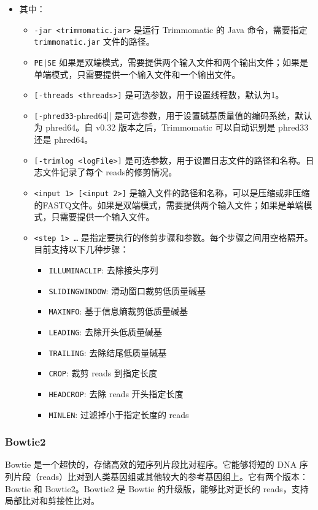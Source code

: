 \documentclass[UTF8]{ctexart}
\begin{document}
\begin{itemize}
	\item 其中：
	\begin{itemize}
		\item \verb|-jar <trimmomatic.jar>| 是运行 Trimmomatic 的 Java 命令，需要指定\\ \verb|trimmomatic.jar| 文件的路径。
		\item \verb!PE|SE! 如果是双端模式，需要提供两个输入文件和两个输出文件；如果是单端模式，只需要提供一个输入文件和一个输出文件。
		\item \verb|[-threads <threads>]| 是可选参数，用于设置线程数，默认为1。
		\item \verb|[-phred33|-phred64]| 是可选参数，用于设置碱基质量值的编码系统，默认为 phred64。自 v0.32 版本之后，Trimmomatic 可以自动识别是 phred33 还是 phred64。
		\item \verb|[-trimlog <logFile>]| 是可选参数，用于设置日志文件的路径和名称。日志文件记录了每个 reads的修剪情况。 
		\item \verb|<input 1> [<input 2>]| 是输入文件的路径和名称，可以是压缩或非压缩的FASTQ文件。如果是双端模式，需要提供两个输入文件；如果是单端模式，只需要提供一个输入文件。
		\item \verb|<step 1> …| 是指定要执行的修剪步骤和参数。每个步骤之间用空格隔开。目前支持以下几种步骤：
		\begin{itemize}
			\item \verb|ILLUMINACLIP|: 去除接头序列
			\item \verb|SLIDINGWINDOW|: 滑动窗口裁剪低质量碱基
			\item \verb|MAXINFO|: 基于信息熵裁剪低质量碱基
			\item \verb|LEADING|: 去除开头低质量碱基
			\item \verb|TRAILING|: 去除结尾低质量碱基
			\item \verb|CROP|: 裁剪 reads 到指定长度
			\item \verb|HEADCROP|: 去除 reads 开头指定长度
			\item \verb|MINLEN|: 过滤掉小于指定长度的 reads
		\end{itemize}
	\end{itemize}
\end{itemize}

\subsubsection{Bowtie2}

Bowtie 是一个超快的，存储高效的短序列片段比对程序。它能够将短的 DNA 序列片段（reads）比对到人类基因组或其他较大的参考基因组上。它有两个版本：Bowtie 和 Bowtie2。Bowtie2 是 Bowtie 的升级版，能够比对更长的 reads，支持局部比对和剪接性比对。
\end{document}
